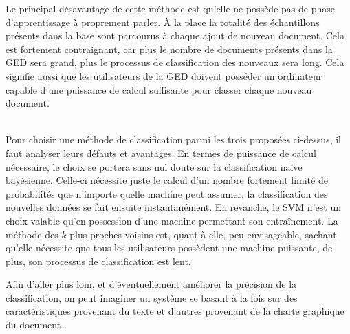 \begin{itemize}
    Le principal désavantage de cette méthode est qu'elle ne possède pas de phase d'apprentissage à proprement parler.
    À la place la totalité des échantillons présents dans la base sont parcourus à chaque ajout de nouveau document.
    Cela est fortement contraignant, car plus le nombre de documents présents dans la GED sera grand, plus le processus de classification des nouveaux sera long.
    Cela signifie aussi que les utilisateurs de la GED doivent posséder un ordinateur capable d'une puissance de calcul suffisante pour classer chaque nouveau document.
\end{itemize}
~\\

Pour choisir une méthode de classification parmi les trois proposées ci-dessus, il faut analyser leurs défauts et avantages.
En termes de puissance de calcul nécessaire, le choix se portera sans nul doute sur la classification naïve bayésienne.
Celle-ci nécessite juste le calcul d'un nombre fortement limité de probabilités que n'importe quelle machine peut assumer, la classification des nouvelles données se fait ensuite instantanément.
En revanche, le SVM n'est un choix valable qu'en possession d'une machine permettant son entraînement.
La méthode des $k$ plus proches voisins est, quant à elle, peu envisageable, sachant qu'elle nécessite que tous les utilisateurs possèdent une machine puissante, de plus, son processus de classification est lent.

Afin d'aller plus loin, et d'éventuellement améliorer la précision de la classification, on peut imaginer un système se basant à la fois sur des caractéristiques provenant du texte et d'autres provenant de la charte graphique du document.